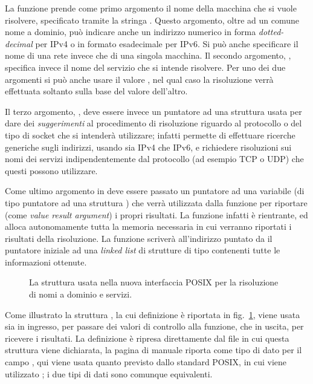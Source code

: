 La funzione prende come primo argomento il nome della macchina che si vuole
risolvere, specificato tramite la stringa . Questo argomento,
oltre ad un comune nome a dominio, può indicare anche un indirizzo numerico in
forma \textit{dotted-decimal} per IPv4 o in formato esadecimale per IPv6.  Si
può anche specificare il nome di una rete invece che di una singola macchina.
Il secondo argomento, , specifica invece il nome del servizio
che si intende risolvere. Per uno dei due argomenti si può anche usare il
valore , nel qual caso la risoluzione verrà effettuata soltanto
sulla base del valore dell'altro.

Il terzo argomento, , deve essere invece un puntatore ad una
struttura  usata per dare dei \textsl{suggerimenti} al
procedimento di risoluzione riguardo al protocollo o del tipo di socket che si
intenderà utilizzare;  infatti permette di effettuare
ricerche generiche sugli indirizzi, usando sia IPv4 che IPv6, e richiedere
risoluzioni sui nomi dei servizi indipendentemente dal protocollo (ad esempio
TCP o UDP) che questi possono utilizzare.

Come ultimo argomento in  deve essere passato un puntatore ad una
variabile (di tipo puntatore ad una struttura ) che verrà
utilizzata dalla funzione per riportare (come \textit{value result argument})
i propri risultati. La funzione infatti è rientrante, ed alloca autonomamente
tutta la memoria necessaria in cui verranno riportati i risultati della
risoluzione.  La funzione scriverà all'indirizzo puntato da  il
puntatore iniziale ad una \textit{linked list} di strutture di tipo
 contenenti tutte le informazioni ottenute.

\begin{figure}[!htb]
  \footnotesize \centering
  \begin{minipage}[c]{0.90\textwidth}
  \end{minipage}
  \caption{La struttura  usata nella nuova interfaccia POSIX
    per la risoluzione di nomi a dominio e servizi.}
  \label{fig:sock_addrinfo_struct}
\end{figure}

Come illustrato la struttura , la cui definizione è riportata
in fig.~\ref{fig:sock_addrinfo_struct}, viene usata sia in ingresso, per
passare dei valori di controllo alla funzione, che in uscita, per ricevere i
risultati. La definizione è ripresa direttamente dal file 
in cui questa struttura viene dichiarata, la pagina di manuale riporta
 come tipo di dato per il campo , qui viene
usata quanto previsto dallo standard POSIX, in cui viene utilizzato
; i due tipi di dati sono comunque equivalenti.

